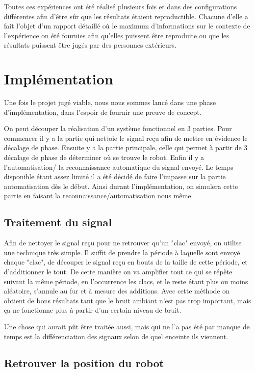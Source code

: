 \documentclass[12pt,a4paper]{report}
\begin{document}
Toutes ces expériences ont été réalisé plusieurs fois et dans des configurations différentes afin d'être sûr que les résultats étaient reproductible. Chacune d'elle a fait l'objet d'un rapport détaillé où le maximum d'informations sur le contexte de l'expérience on été fournies afin qu'elles puissent être reproduite ou que les résultats puissent être jugés par des personnes extérieurs.

\chapter{Implémentation}

Une fois le projet jugé viable, nous nous sommes lancé dans une phase d'implémentation, dans l'espoir de fournir une preuve de concept.

On peut découper la réalisation d'un système fonctionnel en 3 parties. Pour commencer il y a la partie qui nettoie le signal reçu afin de mettre en évidence le décalage de phase. Ensuite y a la partie principale, celle qui permet à partir de 3 décalage de phase de déterminer où se trouve le robot. Enfin il y a l'automatisation/ la reconnaissance automatique du signal envoyé. Le temps disponible étant assez limité il a été décidé de faire l'impasse sur la partie automatisation dès le début. Ainsi durant l'implémentation, on simulera cette partie en faisant la reconnaissance/automatisation nous même.


\section{Traitement du signal}
Afin de nettoyer le signal reçu pour ne retrouver qu'un "clac" envoyé, on utilise une technique très simple. Il suffit de prendre la période à laquelle sont envoyé chaque "clac", de découper le signal reçu en bouts de la taille de cette période, et d'additionner le tout. De cette manière on va amplifier tout ce qui se répète suivant la même période, en l'occurrence les clacs, et le reste étant plus ou moins aléatoire, s'annule au fur et à mesure des additions.
Avec cette méthode on obtient de bons résultats tant que le bruit ambiant n'est pas trop important, mais ça ne fonctionne plus à partir d'un certain niveau de bruit.

Une chose qui aurait pût être traitée aussi, mais qui ne l'a pas été par manque de temps est la différenciation des signaux selon de quel enceinte ils viennent.

\section{Retrouver la position du robot}
\end{document}
